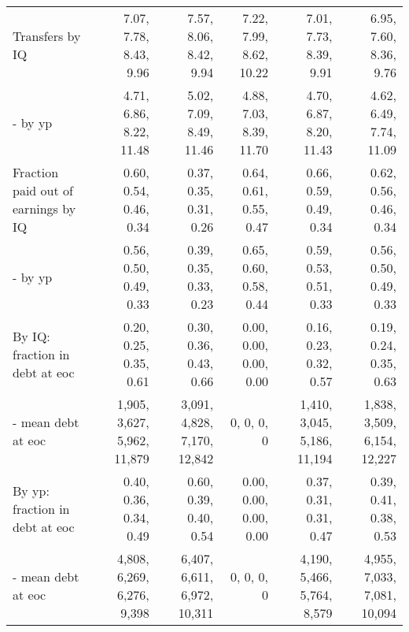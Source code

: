 \begin{tabular}{lrrrrr}
Transfers by IQ & 7.07, 7.78, 8.43, 9.96  & 7.57, 8.06, 8.42, 9.94  & 7.22, 7.99, 8.62, 10.22  & 7.01, 7.73, 8.39, 9.91  & 6.95, 7.60, 8.36, 9.76  \\ 
- by yp & 4.71, 6.86, 8.22, 11.48  & 5.02, 7.09, 8.49, 11.46  & 4.88, 7.03, 8.39, 11.70  & 4.70, 6.87, 8.20, 11.43  & 4.62, 6.49, 7.74, 11.09  \\ 
Fraction paid out of earnings by IQ & 0.60, 0.54, 0.46, 0.34  & 0.37, 0.35, 0.31, 0.26  & 0.64, 0.61, 0.55, 0.47  & 0.66, 0.59, 0.49, 0.34  & 0.62, 0.56, 0.46, 0.34  \\ 
- by yp & 0.56, 0.50, 0.49, 0.33  & 0.39, 0.35, 0.33, 0.23  & 0.65, 0.60, 0.58, 0.44  & 0.59, 0.53, 0.51, 0.33  & 0.56, 0.50, 0.49, 0.33  \\ 
By IQ: fraction in debt at eoc & 0.20, 0.25, 0.35, 0.61  & 0.30, 0.36, 0.43, 0.66  & 0.00, 0.00, 0.00, 0.00  & 0.16, 0.23, 0.32, 0.57  & 0.19, 0.24, 0.35, 0.63  \\ 
- mean debt at eoc & 1,905, 3,627, 5,962, 11,879  & 3,091, 4,828, 7,170, 12,842  & 0, 0, 0, 0  & 1,410, 3,045, 5,186, 11,194  & 1,838, 3,509, 6,154, 12,227  \\ 
By yp: fraction in debt at eoc & 0.40, 0.36, 0.34, 0.49  & 0.60, 0.39, 0.40, 0.54  & 0.00, 0.00, 0.00, 0.00  & 0.37, 0.31, 0.31, 0.47  & 0.39, 0.41, 0.38, 0.53  \\ 
- mean debt at eoc & 4,808, 6,269, 6,276, 9,398  & 6,407, 6,611, 6,972, 10,311  & 0, 0, 0, 0  & 4,190, 5,466, 5,764, 8,579  & 4,955, 7,033, 7,081, 10,094  \\ 
\hline
\end{tabular}%

